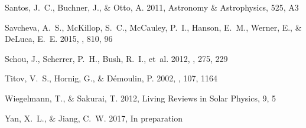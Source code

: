 \documentclass[twocolumn]{aastex6} %
\begin{document}
\begin{CJK*}{UTF8}{gbsn}
\begin{thebibliography}{}
{Santos}, J.~C., {Buchner}, J., \& {Otto}, A. 2011, Astronomy \& Astrophysics, 525, A3

{Savcheva}, A.~S., {McKillop}, S.~C., {McCauley}, P.~I., {Hanson}, E.~M.,
  {Werner}, E., \& {DeLuca}, E.~E. 2015, \apj, 810, 96

{Schou}, J., {Scherrer}, P.~H., {Bush}, R.~I., {et~al.} 2012, \solphys, 275,
  229

{Titov}, V.~S., {Hornig}, G., \& {D{\'e}moulin}, P. 2002, \jgr, 107, 1164

{Wiegelmann}, T., \& {Sakurai}, T. 2012, Living Reviews in Solar Physics, 9, 5

Yan, X.~L., \& Jiang, C.~W. 2017, In preparation

\end{thebibliography}





\end{CJK*}
\end{document}
